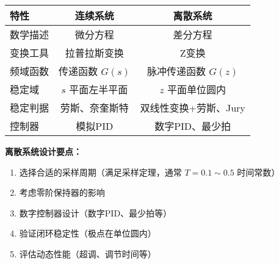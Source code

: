 \begin{center}
\begin{tabular}{|l|c|c|}
\hline
\textbf{特性} & \textbf{连续系统} & \textbf{离散系统} \\
\hline
数学描述 & 微分方程 & 差分方程 \\
\hline
变换工具 & 拉普拉斯变换 & Z变换 \\
\hline
频域函数 & 传递函数 $G(s)$ & 脉冲传递函数 $G(z)$ \\
\hline
稳定域 & $s$ 平面左半平面 & $z$ 平面单位圆内 \\
\hline
稳定判据 & 劳斯、奈奎斯特 & 双线性变换+劳斯、Jury \\
\hline
控制器 & 模拟PID & 数字PID、最少拍 \\
\hline
\end{tabular}
\end{center}

\textbf{离散系统设计要点：}
\begin{enumerate}
    \item 选择合适的采样周期（满足采样定理，通常 $T = 0.1 \sim 0.5$ 时间常数）
    \item 考虑零阶保持器的影响
    \item 数字控制器设计（数字PID、最少拍等）
    \item 验证闭环稳定性（极点在单位圆内）
    \item 评估动态性能（超调、调节时间等）
\end{enumerate}

